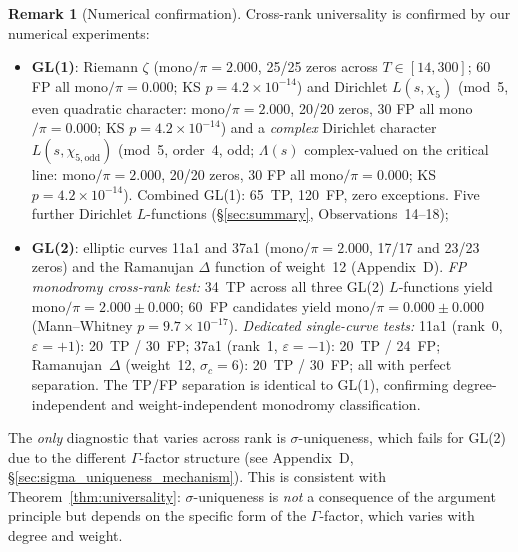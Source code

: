 \documentclass[11pt, a4paper]{article}
\theoremstyle{definition}
\newtheorem{remark}{Remark}[section]
\theoremstyle{plain}
\begin{document}
\begin{remark}[Numerical confirmation]
\label{rem:universality_numerical}
Cross-rank universality is confirmed by our numerical experiments:
\begin{itemize}
  \item \textbf{GL(1)}: Riemann $\zeta$ (mono$/\pi = 2.000$,
    25/25 zeros across $T\in[14,300]$; 60 FP all mono$/\pi = 0.000$;
    KS $p = 4.2\times 10^{-14}$)
    and Dirichlet $L(s,\chi_5)$ (mod~5, even quadratic character:
    mono$/\pi = 2.000$, 20/20 zeros, 30 FP all mono$/\pi = 0.000$;
    KS $p = 4.2\times 10^{-14}$)
    and a \emph{complex} Dirichlet character $L(s,\chi_{5,\mathrm{odd}})$
    (mod~5, order~4, odd; $\Lambda(s)$ complex-valued on the critical line:
    mono$/\pi = 2.000$, 20/20 zeros, 30 FP all mono$/\pi = 0.000$;
    KS $p = 4.2\times 10^{-14}$).
    Combined GL(1): 65~TP, 120~FP, zero exceptions.
    Five further Dirichlet $L$-functions
    (\S\ref{sec:summary}, Observations~14--18);
  \item \textbf{GL(2)}: elliptic curves 11a1 and 37a1
    (mono$/\pi = 2.000$, 17/17 and 23/23 zeros) and the Ramanujan
    $\Delta$ function of weight~12 (Appendix~D).
    \emph{FP monodromy cross-rank test:} 34~TP across all three
    GL(2) $L$-functions yield mono$/\pi = 2.000 \pm 0.000$;
    60~FP candidates yield mono$/\pi = 0.000 \pm 0.000$
    (Mann--Whitney $p = 9.7 \times 10^{-17}$).
    \emph{Dedicated single-curve tests:} 11a1 (rank~0, $\varepsilon=+1$):
    20~TP / 30~FP; 37a1 (rank~1, $\varepsilon=-1$):
    20~TP / 24~FP; Ramanujan~$\Delta$ (weight~12, $\sigma_c=6$):
    20~TP / 30~FP; all with perfect separation.
    The TP/FP separation is identical to GL(1), confirming degree-independent
    and weight-independent monodromy classification.
\end{itemize}
The \emph{only} diagnostic that varies across rank is
$\sigma$-uniqueness, which fails for GL(2) due to the different
$\Gamma$-factor structure (see Appendix~D, \S\ref{sec:sigma_uniqueness_mechanism}).
This is consistent with Theorem~\ref{thm:universality}: $\sigma$-uniqueness
is \emph{not} a consequence of the argument principle but depends on the
specific form of the $\Gamma$-factor, which varies with degree and weight.
\end{remark}
\end{document}
